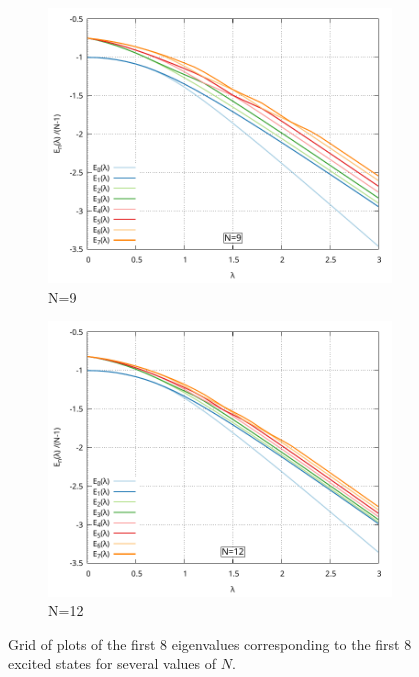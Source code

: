 \documentclass[11pt,a4paper]{article}
\begin{document}
\begin{figure}
\begin{subfigure}{0.49\textwidth}
		\includegraphics[width=1\linewidth]{Plots/EigVals_N09.pdf}
		\caption{N=9}
		\label{fig:N9}
	\end{subfigure}
	\hfill
	\begin{subfigure}{0.49\textwidth}
		\includegraphics[width=1\linewidth]{Plots/EigVals_N12.pdf}
		\caption{N=12}
		\label{fig:N12}
	\end{subfigure}
	\caption{Grid of plots of the first $8$ eigenvalues corresponding to the first $8$ excited states for several values of $N$.}
	\label{fig:plotsN}
\end{figure}
\end{document}
